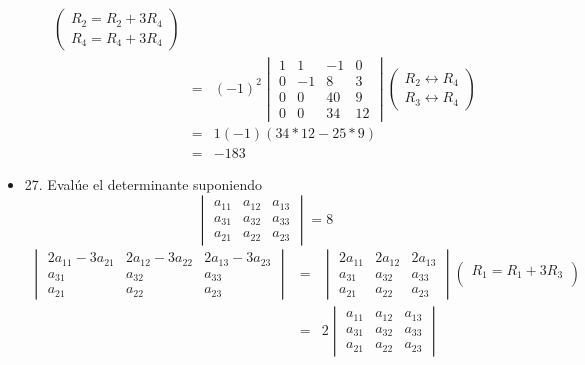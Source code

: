 \documentclass[12pt]{article}
\theoremstyle{plain}
\theoremstyle{definition}
\begin{document}
\begin{itemize}
\begin{eqnarray*}
 \begin{pmatrix}
  R_2=R_2+3R_4 \\ 
  R_4=R_4+3R_4
 \end{pmatrix}\\
 &=&(-1)^2
 \begin{vmatrix}
  1 & 1 & -1 & 0\\
  0 & -1 & 8 & 3\\
  0 & 0 & 40 & 9\\
  0 & 0 & 34 & 12
 \end{vmatrix}
 \begin{pmatrix}
  R_2\leftrightarrow R_4 \\ 
  R_3\leftrightarrow R_4 
 \end{pmatrix}\\
 &=&1(-1)(34*12-25*9)\\
 &=&-183
    \end{eqnarray*}
    \item 27. Evalúe el determinante suponiendo 
    \[\begin{vmatrix}
          a_{11} & a_{12} & a_{13}\\
          a_{31} & a_{32} & a_{33}\\
          a_{21} & a_{22} & a_{23}
        \end{vmatrix}=8
        \]
        \begin{eqnarray*}
        \begin{vmatrix}
          2a_{11}-3a_{21} & 2a_{12}-3a_{22} & 2a_{13}-3a_{23}\\
          a_{31} & a_{32} & a_{33}\\
          a_{21} & a_{22} & a_{23}
        \end{vmatrix}&=&
        \begin{vmatrix}
          2a_{11} & 2a_{12} & 2a_{13}\\
          a_{31} & a_{32} & a_{33}\\
          a_{21} & a_{22} & a_{23}
        \end{vmatrix}
        \begin{pmatrix}
          R_1=R_1+3R_3 \\ 
         \end{pmatrix}\\
         &=& 2\begin{vmatrix}
          a_{11} & a_{12} & a_{13}\\
          a_{31} & a_{32} & a_{33}\\
          a_{21} & a_{22} & a_{23}
        \end{vmatrix}

\end{eqnarray*}
\end{itemize}
\end{document}

